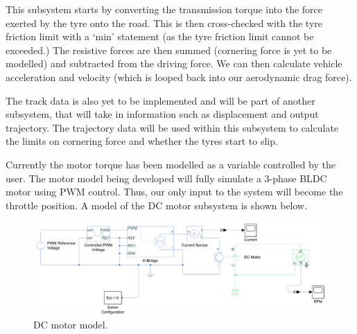 \documentclass{article}
\begin{document}
This subsystem starts by converting the transmission torque into the force exerted by the tyre onto the road. This is then cross-checked with the tyre friction limit with a `min' statement (as the tyre friction limit cannot be exceeded.) The resistive forces are then summed (cornering force is yet to be modelled) and subtracted from the driving force. We can then calculate vehicle acceleration and velocity (which is looped back into our aerodynamic drag force). 

The track data is also yet to be implemented and will be part of another subsystem, that will take in information such as displacement and output trajectory. The trajectory data will be used within this subsystem to calculate the limits on cornering force and whether the tyres start to slip. 

Currently the motor torque has been modelled as a variable controlled by the user. The motor model being developed will fully simulate a 3-phase BLDC motor using PWM control. Thus, our only input to the system will become the throttle position. A model of the DC motor subsystem is shown below. 
\begin{figure}[H]
	\centering
	\includegraphics[width = \textwidth]{./img/simulink2.png}
	\caption{DC motor model.}
\end{figure}
\end{document}
